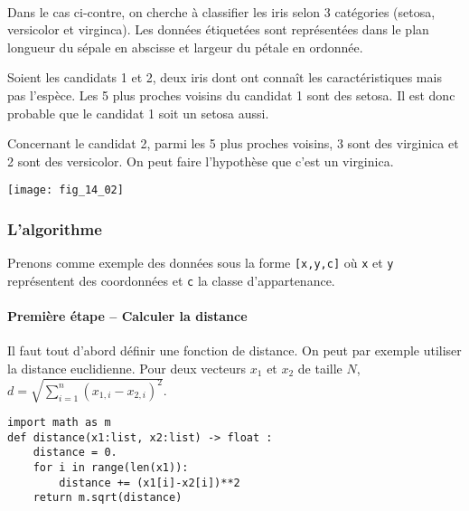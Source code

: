 \begin{exemple}~\\

\begin{minipage}[c]{.6\linewidth}
Dans le cas ci-contre, on cherche à classifier les iris selon 3 catégories (setosa, versicolor et virginca). Les données étiquetées sont représentées dans le plan longueur du sépale en abscisse et largeur du pétale en ordonnée. 

Soient les candidats 1 et 2, deux iris dont ont connaît les caractéristiques mais pas l'espèce. Les 5 plus proches voisins du candidat 1 sont des setosa. Il est donc probable que le candidat 1 soit un setosa aussi.

Concernant le candidat 2, parmi les 5 plus proches voisins, 3 sont des virginica et 2 sont des versicolor. On peut faire l'hypothèse que c'est un virginica. 
\end{minipage} \hfill
\begin{minipage}[c]{.35\linewidth}
\begin{center}
\texttt{[image: fig\_14\_02]}
\end{center}
\end{minipage} 

\end{exemple}

\subsubsection{L'algorithme}

Prenons comme exemple des données sous la forme \texttt{[x,y,c]} où \texttt{x} et \texttt{y} représentent des coordonnées et \texttt{c} la classe d'appartenance.
\paragraph*{Première étape -- Calculer la distance}

Il faut tout d'abord définir une fonction de distance. On peut par exemple utiliser la distance euclidienne.
Pour deux vecteurs $x_1$ et $x_2$ de taille $N$, 
$d = \sqrt{ \sum\limits_{i=1}^n \left(x_{1,i}-x_{2,i} \right)^2}$.

\begin{lstlisting}
import math as m
def distance(x1:list, x2:list) -> float :
    distance = 0.
    for i in range(len(x1)):
        distance += (x1[i]-x2[i])**2
    return m.sqrt(distance)
\end{lstlisting}

